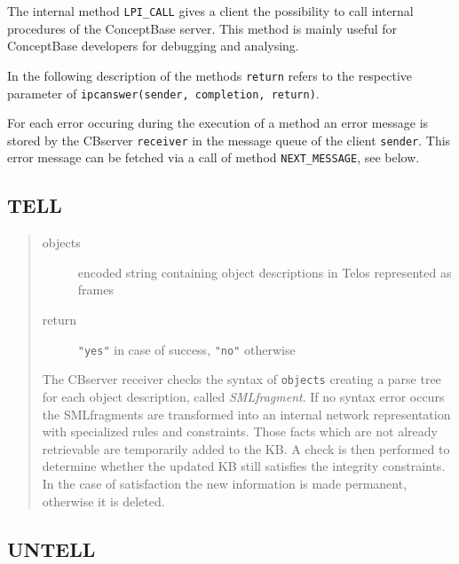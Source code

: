 The internal method {\tt LPI\_CALL} gives a client the possibility to call internal
procedures of the ConceptBase server. This method is mainly useful for ConceptBase
developers for debugging and analysing.

In the following description of the methods {\tt return} refers to the respective
parameter of {\tt ipcanswer(sender, completion, return)}.

For each error occuring during the execution of a method an error message
is stored by the CBserver {\tt receiver} in the message queue of the client
{\tt sender}. This error message can be fetched via a call of method
{\tt NEXT\_MESSAGE}, see below.

\subsection{TELL}


\begin{quote}
\begin{description}
\item[objects] encoded string containing object descriptions in Telos represented as frames
\item[return] \verb+"yes"+ in case of success, \verb+"no"+ otherwise
\end{description}

The CBserver receiver checks the syntax of {\tt objects} creating a parse
tree for each object description, called {\em SMLfragment}.
If no syntax error occurs the SMLfragments are transformed into an
internal network representation with specialized rules and
constraints. Those facts which are not already retrievable are
temporarily added to the KB. A check is then performed to determine
whether the updated KB still satisfies the integrity constraints. In
the case of satisfaction the new information is made permanent,
otherwise it is deleted.
\end{quote}

\subsection{UNTELL}



